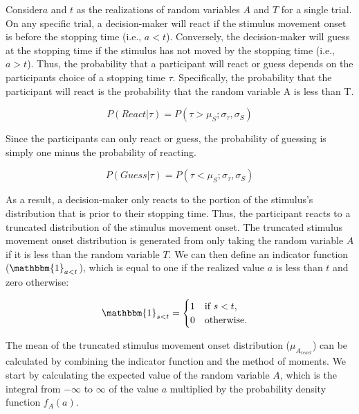 \documentclass[12pt,letterpaper]{article}
\begin{document}
Consider$a$ and $t$ as the realizations of random variables $A$ and $T$ for a single trial. On any specific trial, a decision-maker will react if the stimulus movement onset is before the stopping time (i.e., $a<t$). Conversely, the decision-maker will guess at the stopping time if the stimulus has not moved by the stopping time (i.e., $a>t$). Thus, the probability that a participant will react or guess depends on the participants choice of a stopping time $\tau$. Specifically, the probability that the participant will react is the probability that the random variable A is less than T.

\begin{equation}
    P(React|\tau) = P(\tau>\mu_{S}; \sigma_{\tau}, \sigma_{S})
\end{equation}

Since the participants can only react or guess, the probability of guessing is simply one minus the probability of reacting.

\begin{equation}
    P(Guess|\tau) = P(\tau<\mu_{S}; \sigma_{\tau}, \sigma_{S})
\end{equation}

As a result, a decision-maker only reacts to the portion of the stimulus’s distribution that is prior to their stopping time. Thus, the participant reacts to a truncated distribution of the stimulus movement onset.
The truncated stimulus movement onset distribution is generated from only taking the random variable $A$ if it is less than the random variable $T$. We can then define an indicator function ($\mathbbm{1}_{a<t}$), which is equal to one if the realized value $a$ is less than $t$ and zero otherwise:

\begin{align}
     & \mathbbm{1}_{s<t} =
    \begin{cases}
        1 & \text{if } s < t, \\
        0 & \text{otherwise.}
    \end{cases}
\end{align}

The mean of the truncated stimulus movement onset distribution ($\mu_{A_{react}}$) can be calculated by combining the indicator function and the method of moments. We start by calculating the expected value of the random variable $A$, which is the integral from $-\infty$ to $\infty$ of the value $a$ multiplied by the probability density function $f_{A}(a)$.
\end{document}
